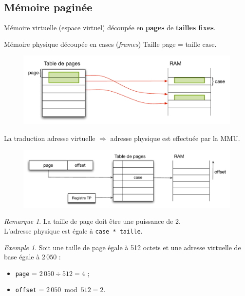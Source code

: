 \documentclass[11pt,english,french]{scrreprt}
\theoremstyle{remark}
\newtheorem*{rem*}{Remarque}
\newtheorem*{ex*}{Exemple}
\theoremstyle{definition}
\begin{document}
\subsection{Mémoire paginée}
Mémoire virtuelle (espace virtuel) découpée en \textbf{pages} de \textbf{tailles fixes}.

Mémoire physique découpée en cases (\emph{frames})
Taille page = taille case.
\begin{figure}[h!]
	\center
	\vspace{-10pt}
	\includegraphics[scale=.6]{img/virt-phy}
\end{figure}

La traduction adresse virtuelle  $\Rightarrow$ adresse physique est effectuée par la MMU.
\begin{figure}[h!]
	\center
	\vspace{-10pt}
	\includegraphics[scale=.6]{img/trad-phy-virt}
\end{figure}
 
\begin{rem*}
	La taille de page doit être une puissance de 2.\\
	L'adresse physique est égale à \lstinline!case * taille!.
\end{rem*}

\begin{ex*}
Soit une taille de page égale à 512 octets et une adresse virtuelle de base égale à $2\,050$ :
\begin{itemize}
	\item \lstinline!page! = $2\,050 \div 512 = 4$ ;
	\item \lstinline!offset! = $2\,050 \bmod 512 = 2$.
\end{itemize}
\end{ex*}
\end{document}
